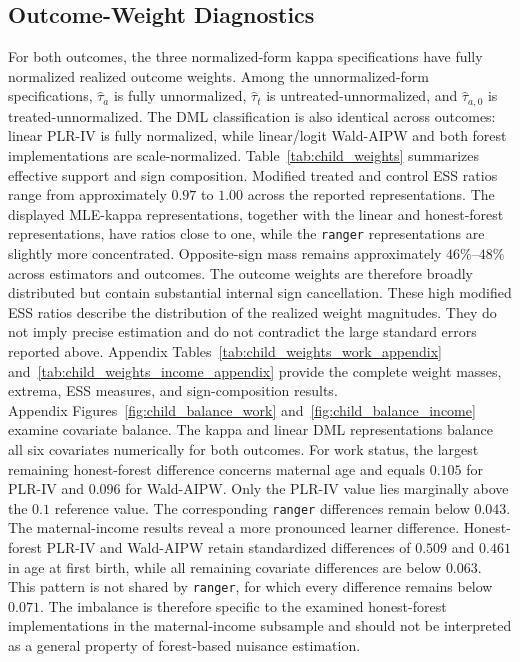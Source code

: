 \documentclass[12pt, a4paper, oneside]{article}
\theoremstyle{plain}
\theoremstyle{definition}
\begin{document}
\subsection{Outcome-Weight Diagnostics}
\label{subsec:child_weight_diagnostics}

For both outcomes, the three normalized-form kappa specifications have fully normalized realized outcome weights. Among the unnormalized-form specifications, \(\widehat{\tau}_{a}\) is fully unnormalized, \(\widehat{\tau}_{t}\) is untreated-unnormalized, and \(\widehat{\tau}_{a,0}\) is treated-unnormalized. The DML classification is also identical across outcomes: linear PLR-IV is fully normalized, while linear/logit Wald-AIPW and both forest implementations are scale-normalized.
Table~\ref{tab:child_weights} summarizes effective support and sign composition. Modified treated and control ESS ratios range from approximately \(0.97\) to \(1.00\) across the reported representations. The displayed MLE-kappa representations, together with the linear and honest-forest representations, have ratios close to one, while the \texttt{ranger} representations are slightly more concentrated. Opposite-sign mass remains approximately \(46\%\)–\(48\%\) across estimators and outcomes. The outcome weights are therefore broadly distributed but contain substantial internal sign cancellation. These high modified ESS ratios describe the distribution of the realized weight magnitudes.
They do not imply precise estimation and do not contradict the large standard errors reported above. Appendix Tables~\ref{tab:child_weights_work_appendix} and~\ref{tab:child_weights_income_appendix} provide the complete weight masses, extrema, ESS measures, and sign-composition results.\\
Appendix Figures~\ref{fig:child_balance_work} and~\ref{fig:child_balance_income} examine covariate balance. The kappa and linear DML representations balance all six covariates numerically for both outcomes. For work status, the largest remaining honest-forest difference concerns maternal age and equals \(0.105\) for PLR-IV and \(0.096\) for Wald-AIPW. Only the PLR-IV value lies marginally above the \(0.1\) reference value. The corresponding \texttt{ranger} differences remain below \(0.043\).
The maternal-income results reveal a more pronounced learner difference. Honest-forest PLR-IV and Wald-AIPW retain standardized differences of \(0.509\) and \(0.461\) in age at first birth, while all remaining covariate differences are below \(0.063\).
This pattern is not shared by \texttt{ranger}, for which every difference remains below \(0.071\). The imbalance is therefore specific to the examined honest-forest implementations in the maternal-income subsample and should not be interpreted as a general property of forest-based nuisance estimation.
\end{document}
